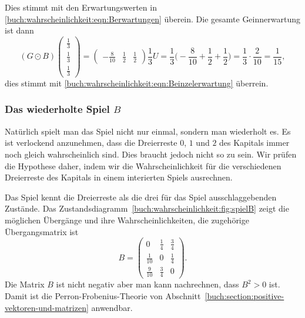Dies stimmt mit den Erwartungswerten in 
\eqref{buch:wahrscheinlichkeit:eqn:Berwartungen}
überein.
Die gesamte Geinnerwartung ist dann
\begin{equation}
(G\odot B)
\begin{pmatrix}\frac13\\\frac13\\\frac13\end{pmatrix}
=
\begin{pmatrix}-\frac{8}{10}&\frac12&\frac12\end{pmatrix}
\frac13U
=
\frac13\biggl(-\frac{8}{10}+\frac12+\frac12\biggr)
=
\frac13\cdot\frac{2}{10}
=
\frac{1}{15},
\label{buch:wahrscheinlichkeit:eqn:BodotEinzelerwartung}
\end{equation}
dies stimmt mit \eqref{buch:wahrscheinlichkeit:eqn:Beinzelerwartung}
überrein.

\subsubsection{Das wiederholte Spiel $B$}
Natürlich spielt man das Spiel nicht nur einmal, sondern man wiederholt es.
Es ist verlockend anzunehmen, dass die Dreierreste $0$, $1$ und $2$ des
Kapitals immer noch gleich wahrscheinlich sind.
Dies braucht jedoch nicht so zu sein.
Wir prüfen die Hypothese daher, indem wir die Wahrscheinlichkeit
für die verschiedenen Dreierreste des Kapitals in einem interierten
Spiels ausrechnen.

Das Spiel kennt die Dreierreste als die drei für das Spiel ausschlaggebenden
Zustände.
Das Zustandsdiagramm~\ref{buch:wahrscheinlichkeit:fig:spielB} zeigt
die möglichen Übergänge und ihre Wahrscheinlichkeiten, die zugehörige
Übergangsmatrix ist
\[
B
=
\begin{pmatrix}
0          &\frac14 &\frac34\\
\frac1{10} &0       &\frac14\\
\frac9{10} &\frac34 &0
\end{pmatrix}.
\]
Die Matrix $B$ ist nicht negativ aber man kann nachrechnen, dass $B^2>0$ ist.
Damit ist die Perron-Frobenius-Theorie von
Abschnitt~\ref{buch:section:positive-vektoren-und-matrizen}
anwendbar.

